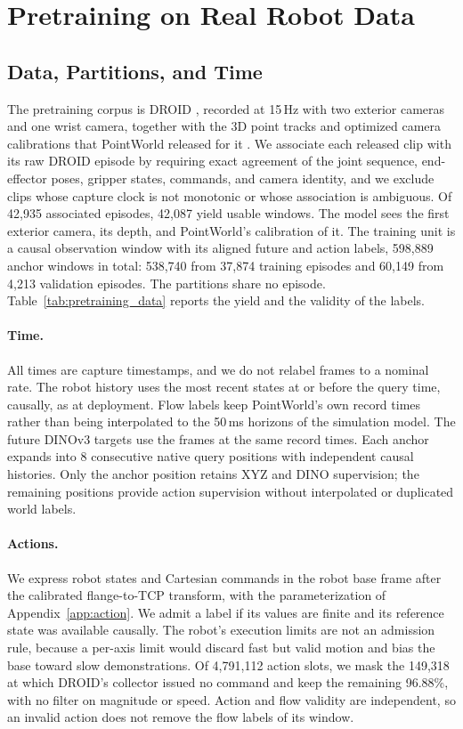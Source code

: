 \section{Pretraining on Real Robot Data}
\label{app:pretraining}

\subsection{Data, Partitions, and Time}
\label{app:droid}
The pretraining corpus is DROID \cite{droid}, recorded at 15\,Hz with two exterior
cameras and one wrist camera, together with the 3D point tracks and optimized camera
calibrations that PointWorld released for it \cite{pointworld}. We associate each
released clip with its raw DROID episode by requiring exact agreement of the joint
sequence, end-effector poses, gripper states, commands, and camera identity, and we
exclude clips whose capture clock is not monotonic or whose association is
ambiguous. Of 42{,}935 associated episodes, 42{,}087 yield usable windows. The
model sees the first exterior camera, its depth, and PointWorld's calibration of it.
The training unit is a causal observation window with its aligned future and action
labels, 598{,}889 anchor windows in total: 538{,}740 from 37{,}874 training episodes
and 60{,}149 from 4{,}213 validation episodes. The partitions share no episode.
Table~\ref{tab:pretraining_data} reports the yield and the
validity of the labels.



\paragraph{Time.} All times are capture timestamps, and we do not relabel frames to
a nominal rate. The robot history uses the \cfgHistoryLen{} most recent states at or
before the query time, causally, as at deployment. Flow labels keep PointWorld's own
record times rather than being interpolated to the 50\,ms horizons of the simulation
model. The future DINOv3 targets use the frames at the same record times. Each anchor
expands into 8 consecutive native query positions with independent causal histories.
Only the anchor position retains XYZ and DINO supervision; the remaining positions
provide action supervision without interpolated or duplicated world labels.

\paragraph{Actions.} We express robot states and Cartesian commands in the robot
base frame after the calibrated flange-to-TCP transform, with the parameterization of
Appendix~\ref{app:action}. We admit a label if its values are finite and its
reference state was available causally. The robot's execution limits are not an
admission rule, because a per-axis limit would discard fast but valid motion and
bias the base toward slow demonstrations. Of 4{,}791{,}112 action slots, we mask
the 149{,}318 at which DROID's collector issued no command and keep the remaining
96.88\%, with no filter on magnitude or speed. Action and flow validity are
independent, so an invalid action does not remove the flow labels of its window.

